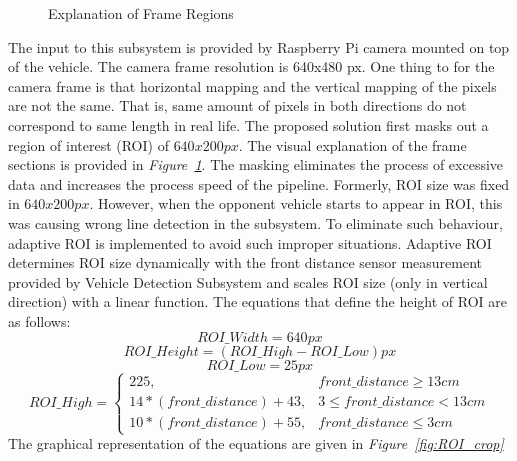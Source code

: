 \documentclass[a4paper,12pt]{article}
\begin{document}
\begin{enumerate}[A.]
\begin{figure}[t]
	\caption{Explanation of Frame Regions}\label{fig:explanation_ROI_ROT}
	
\end{figure}

The input to this subsystem is provided by Raspberry Pi camera mounted on top of the vehicle. The camera frame resolution is 640x480 px. One thing to for the camera frame is that horizontal mapping and the vertical mapping of the pixels are not the same. That is, same amount of pixels in both directions do not correspond to same length in real life. The proposed solution first masks out a region of interest (ROI) of $640x200 px$. The visual explanation of the frame sections is provided in \textit{Figure~\ref{fig:explanation_ROI_ROT}}. The masking eliminates the process of excessive data and increases the process speed of the pipeline. Formerly, ROI size was fixed in $640x200 px$. However, when the opponent vehicle starts to appear in ROI, this was causing wrong line detection in the subsystem. To eliminate such behaviour, adaptive ROI is implemented to avoid such improper situations. Adaptive ROI determines ROI size dynamically with the front distance sensor measurement provided by Vehicle Detection Subsystem and scales ROI size (only in vertical direction) with a linear function. The equations that define the height of ROI are as follows:
\begin{equation}
	ROI\_Width = 640 px
\end{equation}
\begin{equation}
	ROI\_Height = (ROI\_High - ROI\_Low) px
\end{equation}
\begin{equation}
	ROI\_Low = 25 px
\end{equation}
\begin{equation}
	ROI\_High =
		\begin{cases}
		225, & front\_distance \geq 13 cm \\
		14*(front\_distance) + 43, &3\leq front\_distance <  13 cm \\
		10*(front\_distance) + 55, & front\_distance \leq 3 cm
		\end{cases}
\end{equation}
The graphical representation of the equations are given in \textit{Figure~\ref{fig:ROI_crop}}


\begin{figure}[t!]
	
	\setlength{\unitlength}{\textwidth} 
	
	\centering
	

\end{figure}
\end{enumerate}
\end{document}
